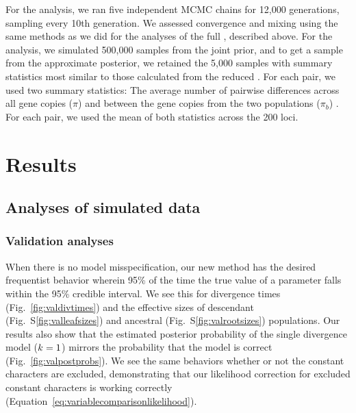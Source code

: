 For the \ecoevolity analysis, we ran five independent MCMC chains for 12,000
generations, sampling every 10th generation.
We assessed convergence and mixing using the same methods as we did for the
analyses of the full  \dataset, described above.
For the \dppmsbayes analysis, we simulated 500,000 samples from the joint
prior, and to get a sample from the approximate posterior, we retained the
5,000 samples with summary statistics most similar to those calculated
from the reduced  \dataset.
For each pair, we used two summary statistics:
The average number of pairwise differences across all gene copies ($\pi$) and
between the gene copies from the two populations ($\pi_b$) \citep{NeiLi1979}.
For each pair, we used the mean of both statistics across the 200 loci.


\section{Results}

\subsection{Analyses of simulated data}

\subsubsection{Validation analyses}

When there is no model misspecification, our new method has the desired
frequentist behavior wherein 95\% of the time the true value of a parameter
falls within the 95\% credible interval.
We see this for
divergence times
(Fig.~\ref{fig:valdivtimes})
and the effective sizes of
descendant
(Fig.~S\ref{fig:valleafsizes})
and ancestral
(Fig.~S\ref{fig:valrootsizes})
populations.
Our results also show that the estimated posterior probability of the single
divergence model ($k_{}{} = 1$) mirrors the probability that the model
is correct 
(Fig.~\ref{fig:valpostprobs}).
We see the same behaviors whether or not the constant characters are excluded,
demonstrating that our likelihood correction for excluded constant
characters is working correctly
(Equation~\ref{eq:variablecomparisonlikelihood}).

\ifembed{



}{}

